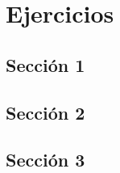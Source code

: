 \chapter{Ejercicios}

\section{Sección 1}


\section{Sección 2}


\begin{ejercicio}[Libro 2.10]
\end{ejercicio}

\section{Sección 3}


